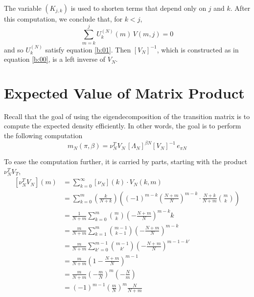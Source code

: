 \documentclass{article}
\newcommand{\ppar}[1]{\left( #1 \right)}
\newcommand{\spar}[1]{\left[ #1 \right]}
\begin{document}
The variable ${\ppar{K_{j,k} }}$ is used to shorten terms that depend only on $j$ and $k$.
%
After this computation, we conclude that, for $k<j$,
\begin{equation}
    \sum_{m=k}^j {U_k^{(N)}}(m)\, V(m,j) = 0
\end{equation}
and so ${U_k^{(N)}}$ satisfy equation \eqref{b:01}.
%
Then $\spar{V_N}^{-1}$, which is constructed as in equation \eqref{b:00}, is a left inverse of $V_N$.





\section{Expected Value of Matrix Product}
\label{ap:product}

Recall that the goal of using the eigendecomposition of the transition matrix is to compute the expected density efficiently.
%
In other words, the goal is to perform the following computation
\begin{equation}
    m_N(\pi, \beta) = 
    {\nu_N^T 
    V_N}\, \spar{\Lambda_N}^{\beta N} \spar{V_N}^{-1}\,e_{\pi N}
\end{equation}

%
To ease the computation further, it is carried by parts, starting with the product $\nu_N^T V_T$,
\begin{align*}
    \spar{\nu_N^T V_N}(m) &=
    \sum_{k=0}^\infty \spar{\nu_N}(k) \cdot V_N(k,m) \\
    &=
    \sum_{k=0}^m
    \ppar{\frac{k}{N+k}}
    \ppar{(-1)^{m-k} \ppar{\frac{N+m}{N}}^{m-k} \cdot \frac{N+k}{N+m} \binom{m}{k}}
    \\
    &=
    \frac{1}{N+m}
    \sum_{k=0}^m
    \binom{m}{k}
    \ppar{- \frac{N+m}{N}}^{m-k} k
    \\
    &=
    \frac{m}{N+m}
    \sum_{k=1}^m
    \binom{m-1}{k-1}
    \ppar{- \frac{N+m}{N}}^{m-k}
    \\
    &=
    \frac{m}{N+m}
    \sum_{k'=0}^{m-1}
    \binom{m-1}{k'}
    \ppar{- \frac{N+m}{N}}^{m-1-k'}
    \\
    &=
    \frac{m}{N+m}
    \ppar{1-\frac{N+m}{N}}^{m-1}
    \\
    &=
    \frac{m}{N+m}
    \ppar{-\frac{m}{N}}^m \ppar{-\frac{N}{m}}
    \\
    &=
    (-1)^{m-1} \ppar{\frac{m}{N}}^m \frac{N}{N+m}
\end{align*}
\end{document}
